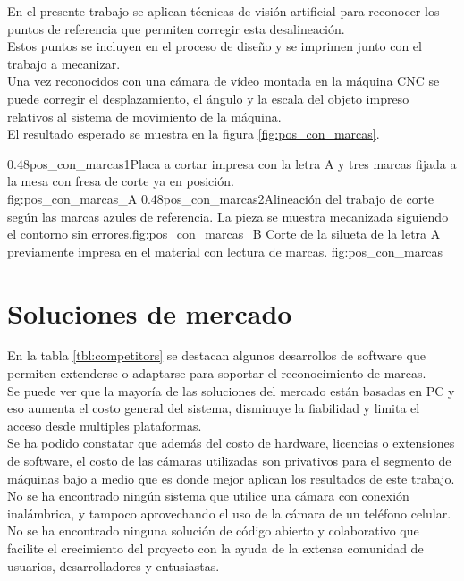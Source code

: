          En el presente trabajo se aplican técnicas de visión artificial para reconocer los puntos de referencia que permiten corregir esta desalineación. \\
         Estos puntos se incluyen en el proceso de diseño y se imprimen junto con el trabajo a mecanizar.\\ 
         Una vez reconocidos con una cámara de vídeo montada en la máquina CNC se puede corregir el desplazamiento, el ángulo y la escala del objeto impreso relativos al sistema de movimiento de la máquina.\\
         El resultado esperado se muestra en la figura \ref{fig:pos_con_marcas}.

\subfigab
         {0.48}{pos_con_marcas1}{Placa a cortar impresa con la letra A y tres marcas fijada a la mesa con fresa de corte ya en posición.\\ \vphantom{10}}{fig:pos_con_marcas_A}
         {0.48}{pos_con_marcas2}{Alineación del trabajo de corte según las marcas azules de referencia. La pieza se muestra mecanizada siguiendo el contorno sin errores.}{fig:pos_con_marcas_B}
         {Corte de la silueta de la letra A previamente impresa en el material con lectura de marcas. }
         {fig:pos_con_marcas}



\section{Soluciones de mercado}
   En la tabla \ref{tbl:competitors} se destacan algunos desarrollos de software que permiten extenderse o adaptarse para soportar el reconocimiento de marcas.\\
   Se puede ver que la mayoría de las soluciones del mercado están basadas en PC y eso aumenta el costo general del sistema, disminuye la fiabilidad y limita el acceso desde multiples plataformas.\\
   Se ha podido constatar que además del costo de hardware, licencias o extensiones de software, el costo de las cámaras utilizadas son privativos para el segmento de máquinas bajo a medio que es donde mejor aplican los resultados de este trabajo.\\
   No se ha encontrado ningún sistema que utilice una cámara con conexión inalámbrica, y tampoco aprovechando el uso de la cámara de un teléfono celular.\\ 
   No se ha encontrado ninguna solución de código abierto y colaborativo que facilite el crecimiento del proyecto con la ayuda de la extensa comunidad de usuarios, desarrolladores y entusiastas. 

